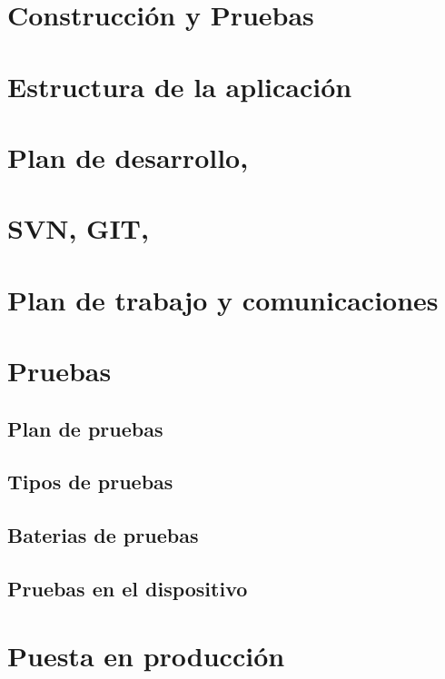 \documentclass[../pfc.tex]{subfiles}
\begin{document}
	
	\section{Construcción y Pruebas}
	
	\section{Estructura de la aplicación}
	
	\section{Plan de desarrollo, }
	
	\section{SVN, GIT,}
	
	\section{Plan de trabajo y comunicaciones}
	
	\section{Pruebas}
	
		\subsection{Plan de pruebas}
		
		\subsection{Tipos de pruebas}
		
		\subsection{Baterias de pruebas}
		
		\subsection{Pruebas en el dispositivo}
	
	\section{Puesta en producción}
	
\end{document}
